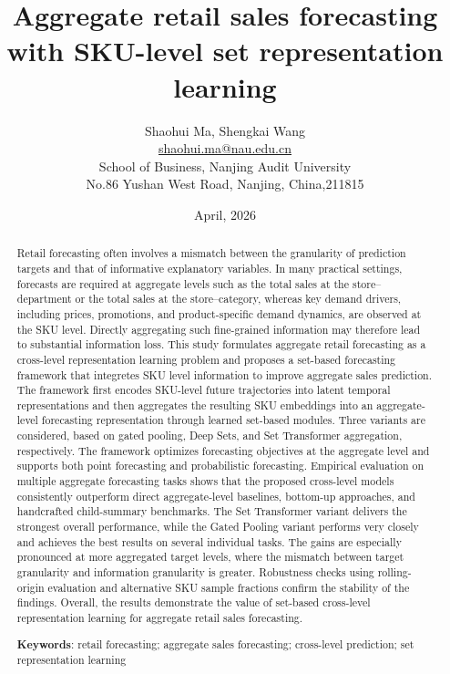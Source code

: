 \documentclass[12pt]{article}
\title{Aggregate retail sales forecasting with SKU-level set representation learning }
\author{%
    \begin{tabular}{c}
        Shaohui Ma, Shengkai Wang\\
        \href{mailto:shaohui.ma@nau.edu.cn}{\underline{shaohui.ma@nau.edu.cn}} \\
        School of Business, Nanjing Audit University \\
        No.86 Yushan West Road, Nanjing, China,211815 \\
    \end{tabular}%
}
\date{April, 2026}
\begin{document}
\maketitle
\newpage

\begin{abstract}
  Retail forecasting often involves a mismatch between the granularity of prediction targets and that of informative explanatory variables. In many practical settings, forecasts are required at aggregate levels such as the total sales at the store--department or the total sales at the store--category, whereas key demand drivers, including prices, promotions, and product-specific demand dynamics, are observed at the SKU level. Directly aggregating such fine-grained information may therefore lead to substantial information loss. This study formulates aggregate retail forecasting as a cross-level representation learning problem and proposes a set-based forecasting framework that integretes SKU level information to improve aggregate sales prediction. The framework first encodes SKU-level future trajectories into latent temporal representations and then aggregates the resulting SKU embeddings into an aggregate-level forecasting representation through learned set-based modules. Three variants are considered, based on gated pooling, Deep Sets, and Set Transformer aggregation, respectively. The framework optimizes forecasting objectives at the aggregate level and supports both point forecasting and probabilistic forecasting. Empirical evaluation on multiple aggregate forecasting tasks shows that the proposed cross-level models consistently outperform direct aggregate-level baselines, bottom-up approaches, and handcrafted child-summary benchmarks. The Set Transformer variant delivers the strongest overall performance, while the Gated Pooling variant performs very closely and achieves the best results on several individual tasks. The gains are especially pronounced at more aggregated target levels, where the mismatch between target granularity and information granularity is greater. Robustness checks using rolling-origin evaluation and alternative SKU sample fractions confirm the stability of the findings. Overall, the results demonstrate the value of set-based cross-level representation learning for aggregate retail sales forecasting.

  \vspace{1em}

  \textbf{Keywords}: retail forecasting; aggregate sales forecasting; cross-level prediction; set representation learning

\end{abstract}
\end{document}
